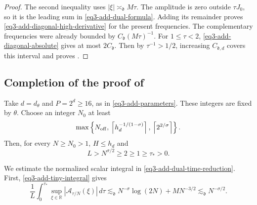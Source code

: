 \documentclass[reqno,12pt]{amsart}
\def \R {\mathbb R}
\numberwithin{equation}{section}
\begin{document}
\begin{proof}
The second inequality uses $|\xi|\asymp_{\mathfrak d}M\tau$.
The amplitude is zero outside $\tau J_0$, so it is the leading
sum in \eqref{eq3-add-dual-formula}. Adding its remainder proves
\eqref{eq3-add-diagonal-high-derivative} for the present frequencies.
The complementary frequencies were already bounded by
$C_{\mathfrak d}(M\tau)^{-1}$.
For $1\le\tau<2$, \eqref{eq3-add-diagonal-absolute} gives
at most $2C_{\mathfrak d}$.
Then by $\tau^{-1}>1/2$, increasing $C_{\mathfrak d,d}$ covers this interval and proves
.
\end{proof}

\subsection{Completion of the proof of \texorpdfstring{}{Theorem~}}\label{sec3-13}

Take $d=d_\theta$ and $P=2^d\ge 16$, as in
\eqref{eq3-add-parameters}. These integers are fixed by $\theta$.
Choose an integer $N_0$ at least
\[
 \max\left\{N_{\rm off},\,
 \left\lceil h_d^{-1/(1-\sigma)}\right\rceil,\,
 \left\lceil 2^{2/\sigma}\right\rceil\right\}.
\]
Then, for every $N\ge N_0>1$, $H\le h_d$ and
$$L>N^{\sigma/2}\ge 2\ge 1\ge \tau_{*}>0.$$

We estimate the normalized scalar integral in
\eqref{eq3-add-dual-time-reduction}. First,
\eqref{eq3-add-tiny-integral} gives
\begin{equation}
 \frac1L\int_0^{\tau_*}\sup_{\xi\in\R}
       |\mathcal A_{\tau/N}(\xi)|\,d\tau
 \lesssim_{\mathfrak d}N^{-\sigma}\log(2N)+MN^{-3/2}
 \lesssim_{\mathfrak d}N^{-\sigma/2}.
 \label{eq3-add-final-tiny}
\end{equation}
\end{document}
